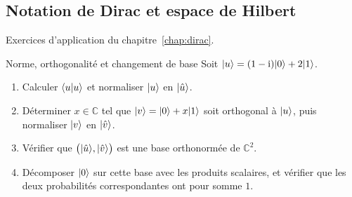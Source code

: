 \subsection{Notation de Dirac et espace de Hilbert}\label{sec:ex-dirac}

Exercices d'application du chapitre~\ref{chap:dirac}.

\begin{exercice}{Norme, orthogonalité et changement de base}\label{ex:orthogo}
Soit $|u\rangle=(1-\mathrm{i})|0\rangle+2|1\rangle$.
\begin{enumerate}[label=\arabic*.,nosep]
  \item Calculer $\langle u|u\rangle$ et normaliser $|u\rangle$ en $|\hat u\rangle$.
  \item Déterminer $x\in\mathbb{C}$ tel que $|v\rangle=|0\rangle+x|1\rangle$ soit orthogonal à $|u\rangle$, puis
        normaliser $|v\rangle$ en $|\hat v\rangle$.
  \item Vérifier que $\big(|\hat u\rangle,|\hat v\rangle\big)$ est une base orthonormée de $\mathbb{C}^2$.
  \item Décomposer $|0\rangle$ sur cette base avec les produits scalaires, et vérifier que les deux
        probabilités correspondantes ont pour somme $1$.
\end{enumerate}
\end{exercice}
